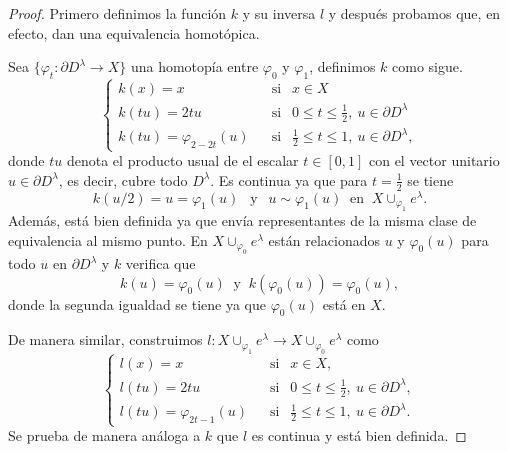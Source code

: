 \begin{proof}

    Primero definimos la función $k$ y su inversa $l$ y después probamos que, en efecto, dan una equivalencia homotópica. 
    
    Sea $\{\varphi_t:\partial D^{\lambda} \to X\}$ una homotopía entre $\varphi_0$ y $\varphi_1$, definimos $k$ como sigue.
    \begin{equation*}
        \begin{cases}
            k(x) = x &~~\text{ si }~~ x\in X\\
            k(tu) = 2tu &~~\text{ si }~~ 0\le t\le \frac{1}{2},~u\in \partial D^{\lambda}\\
            k(tu) = \varphi_{2-2t}(u) &~~\text{ si }~~  \frac{1}{2} \le t\le 1,~u\in \partial D^{\lambda},
        \end{cases}
    \end{equation*}
    donde $tu$ denota el producto usual de el escalar $t\in [0,1]$ con el vector unitario $u\in \partial D^{\lambda}$, es decir, cubre todo $D^{\lambda}$. Es continua ya que para $t=\frac{1}{2}$ se tiene
    \begin{equation*}
        k(u/2) = u = \varphi_{1}(u) ~~\text{ y }~~ u \sim \varphi_{1}(u) ~\text{ en }~ X\cup_{\varphi_1} e^{\lambda}.
    \end{equation*}
    Además, está bien definida ya que envía representantes de la misma clase de equivalencia al mismo punto. En $X\cup_{\varphi_0} e^{\lambda}$ están relacionados $u$ y $\varphi_0(u)$ para todo $u$ en $\partial D^{\lambda}$ y $k$ verifica que 
    \begin{equation*}
        k(u) = \varphi_{0}(u) ~\text{ y }~ k(\varphi_{0}(u)) = \varphi_{0}(u),
    \end{equation*} 
    donde la segunda igualdad se tiene ya que $\varphi_{0}(u)$ está en $X$.
      
    De manera similar, construimos $l: X\cup_{\varphi_1} e^{\lambda} \to X\cup_{\varphi_0} e^{\lambda}$ como
    \begin{equation*}
        \begin{cases}
            l(x) = x &~~\text{ si }~~ x\in X,\\
            l(tu) = 2tu &~~\text{ si }~~ 0\le t\le \frac{1}{2},~u\in \partial D^{\lambda},\\
            l(tu) = \varphi_{2t-1}(u) &~~\text{ si }~~  \frac{1}{2} \le t\le 1,~u\in \partial D^{\lambda}.
        \end{cases}
    \end{equation*}
    Se prueba de manera análoga a $k$ que $l$ es continua y está bien definida.
    

\end{proof}
